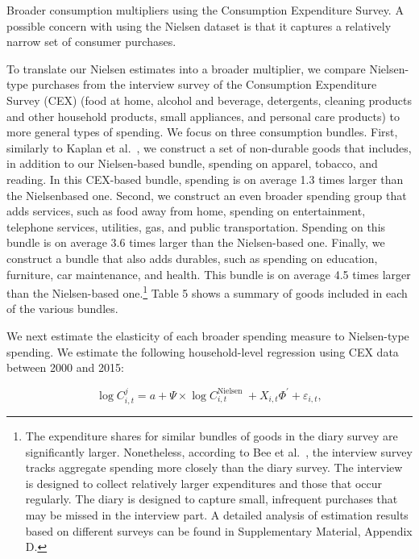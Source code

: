 \documentclass[\latexroot/\projectname]{subfiles}
\begin{document}
Broader consumption multipliers using the Consumption Expenditure Survey. A possible concern with using the Nielsen dataset is that it captures a relatively narrow set of consumer purchases.





To translate our Nielsen estimates into a broader multiplier, we compare Nielsen-type purchases from the interview survey of the Consumption Expenditure Survey (CEX) (food at home, alcohol and beverage, detergents, cleaning products and other household products, small appliances, and personal care products) to more general types of spending. We focus on three consumption bundles. First, similarly to Kaplan et al.~\cite{Kaplan2020-oh}, we construct a set of non-durable goods that includes, in addition to our Nielsen-based bundle, spending on apparel, tobacco, and reading. In this CEX-based bundle, spending is on average 1.3 times larger than the Nielsenbased one. Second, we construct an even broader spending group that adds services, such as food away from home, spending on entertainment, telephone services, utilities, gas, and public transportation. Spending on this bundle is on average 3.6 times larger than the Nielsen-based one. Finally, we construct a bundle that also adds durables, such as spending on education, furniture, car maintenance, and health. This bundle is on average 4.5 times larger than the Nielsen-based one.\footnote{The expenditure shares for similar bundles of goods in the diary survey are significantly larger. Nonetheless, according to Bee et al.~\cite{Bee2012-xe}, the interview survey tracks aggregate spending more closely than the diary survey. The interview is designed to collect relatively larger expenditures and those that occur regularly. The diary is designed to capture small, infrequent purchases that may be missed in the interview part. A detailed analysis of estimation results based on different surveys can be found in Supplementary Material, Appendix D.} Table 5 shows a summary of goods included in each of the various bundles.



We next estimate the elasticity of each broader spending measure to Nielsen-type spending. We estimate the following household-level regression using CEX data between 2000 and 2015:


\begin{equation*}
\log C_{i, t}^{j}=a+\Psi \times \log C_{i, t}^{\text {Nielsen }}+X_{i, t} \Phi^{\prime}+\varepsilon_{i, t}, \tag{3.3}
\end{equation*}
\end{document}

